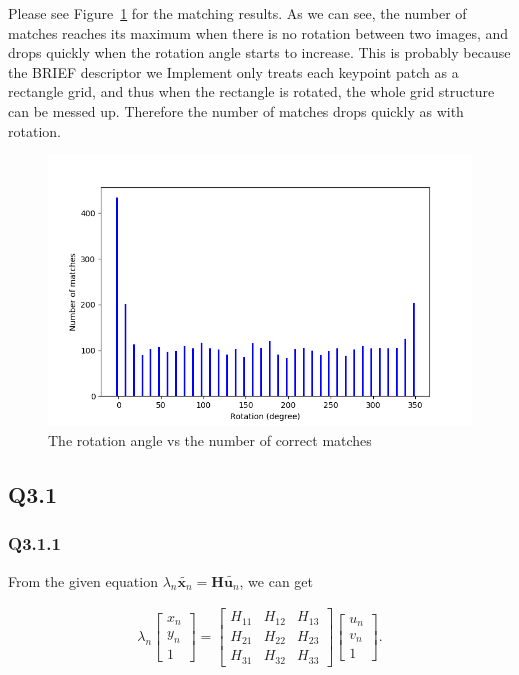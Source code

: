 \documentclass[11pt]{article}
\begin{document}
Please see Figure~\ref{fig:q2.5} for the matching results. As we can see, the number of matches reaches its maximum when there is no rotation between two images, and drops quickly when the rotation angle starts to increase. This is probably because the BRIEF descriptor we Implement only treats each keypoint patch as a rectangle grid, and thus when the rectangle is rotated, the whole grid structure can be messed up. Therefore the number of matches drops quickly as with rotation.

\begin{figure}[h!]
    \centering
    \includegraphics[width=.8\linewidth]{../results/q2_5.png}
    \caption{The rotation angle vs the number of correct matches}
    \label{fig:q2.5}
\end{figure}

\newpage

\subsection*{Q3.1}

\subsubsection*{Q3.1.1}

\newcommand{\vecxn}{\tilde{\mathbf{x}_n}}
\newcommand{\vecun}{\tilde{\mathbf{u}_n}}

From the given equation $\lambda_n \vecxn = \mathbf{H} \vecun$, we can get

\begin{align}
    \lambda_n
    \begin{bmatrix}
        x_{n} \\ y_{n} \\ 1
    \end{bmatrix}
    =
    \begin{bmatrix}
        H_{11} & H_{12} & H_{13} \\
        H_{21} & H_{22} & H_{23} \\
        H_{31} & H_{32} & H_{33}
    \end{bmatrix}
    \begin{bmatrix}
        u_{n} \\ v_{n} \\ 1
    \end{bmatrix}.
\end{align}
\end{document}
